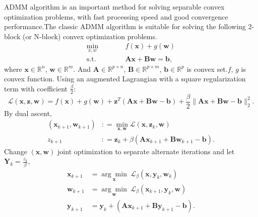 \documentclass{article}
\begin{document}
{ADMM algorithm is an important method for solving separable convex optimization problems, with fast processing speed and good convergence performance.The classic ADMM algorithm is suitable for solving the following 2-block (or N-block) convex optimization problems.
\begin{equation}
    \begin{aligned}
        \underset{x,w}{\min}\qquad&\quad f(\mathbf x) + g(\mathbf w)\\
        \text{s.t.}\qquad&\quad  \mathbf A\mathbf x+\mathbf B\mathbf w = \mathbf b,
    \end{aligned}
    \label{admmlg}
\end{equation}
where $\mathbf x \in \mathbb{R}^n$, $\mathbf w \in \mathbb{R}^m$. And $\mathbf A \in \mathbb{R}^{p \times n}$, $\mathbf B \in \mathbb{R}^{p \times m}$, $\mathbf b \in \mathbb{R}^p$ is convex set.$f$, $g$ is convex function.
Using an augmented Lagrangian with a square regularization term with coefficient $\frac{\beta}{2}$:
\begin{equation}
    \mathcal{L}(\mathbf x,\mathbf z,\mathbf w) = f(\mathbf x) +g(\mathbf w) + \mathbf z^T(\mathbf A\mathbf x+\mathbf B\mathbf w-\mathbf b) + \frac{\beta}{2} \lVert \mathbf A\mathbf x+\mathbf B\mathbf w-\mathbf b \rVert_2^2.
\end{equation}
By dual ascent,
\begin{equation}
    \begin{aligned}
        (\mathbf x_{k+1},\mathbf w_{k+1}) & \colon = \underset{\mathbf x,\mathbf w}{\min} \mathcal{L}(\mathbf x,\mathbf z_k,\mathbf w)\\
        z_{k+1} & \colon = \mathbf z_k + \beta (\mathbf A \mathbf x_{k+1} + \mathbf B \mathbf w_{k+1} - \mathbf b).
    \end{aligned}
\end{equation}
Change $(\mathbf x,\mathbf w)$ joint optimization to separate alternate iterations and let $\mathbf Y_k = \frac{z_k}{\beta}$,
\begin{equation}
    \begin{aligned}
        \mathbf x_{k+1} &  = \underset{\mathbf x}{\arg\min}\  \mathcal{L}_{\beta}(\mathbf x,\mathbf y_k,\mathbf w_{k})\\
        \mathbf w_{k+1} &  = \underset{\mathbf w}{\arg\min}\  \mathcal{L}_{\beta}(\mathbf x_{k+1},\mathbf y_k,\mathbf w)\\
        \mathbf y_{k+1} &  = \mathbf y_k + (\mathbf A \mathbf x_{k+1} + \mathbf B \mathbf y_{k+1} - \mathbf b).
    \end{aligned}
\end{equation}

}
\end{document}

